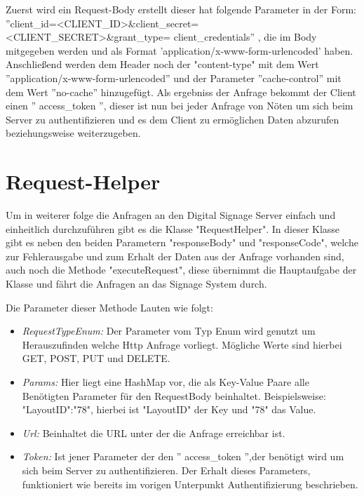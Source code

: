 Zuerst wird ein Request-Body erstellt dieser hat folgende Parameter in der Form: 
 ''client\_id=<CLIENT\_ID>\&client\_secret=<CLIENT\_SECRET>\&grant\_type=
 client\_credentials''
, die im Body mitgegeben werden und als Format 'application/x-www-form-urlencoded'  haben. Anschließend werden dem Header noch der "content-type" mit dem Wert ''application/x-www-form-urlencoded'' und der Parameter ''cache-control'' mit dem Wert ''no-cache'' hinzugefügt. Als ergebniss der Anfrage bekommt der Client einen '' access\_token '', dieser ist nun bei jeder Anfrage von Nöten um sich beim Server zu authentifizieren und es dem Client zu ermöglichen Daten abzurufen beziehungsweise weiterzugeben.

\section{Request-Helper}
Um in weiterer folge die Anfragen an den Digital Signage Server einfach und einheitlich durchzuführen gibt es die Klasse "RequestHelper". In dieser Klasse gibt es neben den beiden Parametern "responseBody" und "responseCode", welche zur Fehlerausgabe und zum Erhalt der Daten aus der Anfrage vorhanden sind, auch noch die Methode "executeRequest", diese übernimmt die Hauptaufgabe der Klasse und fährt die Anfragen an das Signage System durch.

Die Parameter dieser Methode Lauten wie folgt:

\begin{itemize}
	\item {\em RequestTypeEnum:} Der Parameter vom Typ Enum wird genutzt um Herauszufinden welche Http Anfrage vorliegt. Mögliche Werte sind hierbei GET, POST, PUT und DELETE.
	
	\item {\em Params:} Hier liegt eine HashMap vor, die als Key-Value Paare alle Benötigten Parameter für den RequestBody beinhaltet. Beispielsweise: "LayoutID":"78", hierbei ist "LayoutID" der Key und "78" das Value.
		
	\item {\em Url:} Beinhaltet die URL unter der die Anfrage erreichbar ist. 
	
	\item {\em Token:} Ist jener Parameter der den '' access\_token '',der benötigt wird um sich beim Server zu authentifizieren. Der Erhalt dieses Parameters, funktioniert wie bereits im vorigen Unterpunkt Authentifizierung beschrieben.
	
\end{itemize}

